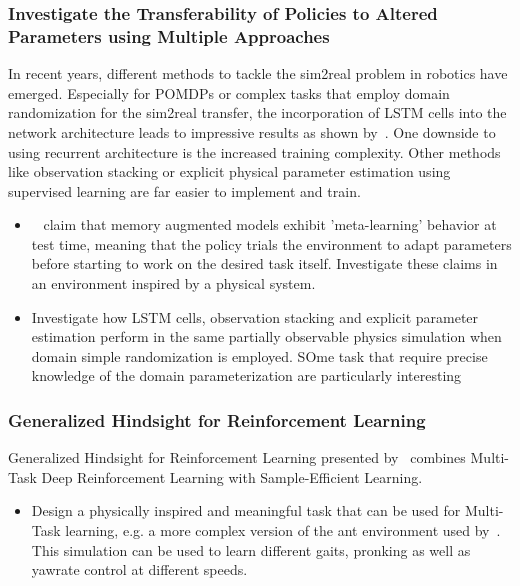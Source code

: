 \documentclass[a4paper]{article}
\begin{document}
\subsubsection{Investigate the Transferability of Policies to Altered Parameters using Multiple Approaches}
In recent years, different methods to tackle the sim2real problem in robotics have emerged. Especially for POMDPs or complex tasks that employ domain randomization for the sim2real transfer, the incorporation of LSTM cells into the network architecture leads to impressive results as shown by~\cite{OpenAI2019}. One downside to using recurrent architecture is the increased training complexity. Other methods like observation stacking or explicit physical parameter estimation using supervised learning are far easier to implement and train.
\begin{itemize}
\item ~\cite{OpenAI2019} claim that memory augmented models exhibit 'meta-learning' behavior at test time, meaning that the policy trials the environment to adapt parameters before starting to work on the desired task itself. Investigate these claims in an environment inspired by a physical system.
\item Investigate how LSTM cells, observation stacking and explicit parameter estimation perform in the same partially observable physics simulation when domain simple randomization is employed. SOme task that require precise knowledge of the domain parameterization are particularly interesting
\end{itemize}

\subsubsection{Generalized Hindsight for Reinforcement Learning}
Generalized Hindsight for Reinforcement Learning presented by~\cite{Li2020} combines Multi-Task Deep Reinforcement Learning with Sample-Efficient Learning.
\begin{itemize}
\item Design a physically inspired and meaningful task that can be used for Multi-Task learning, e.g. a more complex version of the ant environment used by~\cite{Li2020}. This simulation can be used to learn different gaits, pronking as well as yawrate control at different speeds.
\end{itemize}
\end{document}
